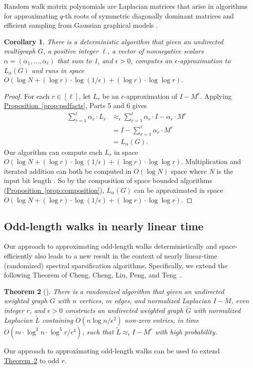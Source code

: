 \documentclass[11pt]{article}
\numberwithin{equation}{section}
\newtheorem{theorem}{Theorem}[section]
\newtheorem{corollary}[theorem]{Corollary}
\theoremstyle{definition}
\theoremstyle{plain}
\newcommand{\expref}[2]{\hyperref[#2]{#1~\ref{#2}}}
\newcommand{\wt}{\widetilde}   %
\newcommand{\SC}{O(\log N + (\log r)\cdot\log(1/\epsilon)+(\log r)\cdot \log\log r)}
\numberwithin{myalgctr}{section}
\theoremstyle{named}
\begin{document}
Random walk matrix polynomials are Laplacian matrices that arise in algorithms for approximating $q$-th roots of symmetric diagonally dominant matrices and efficient sampling from Gaussian graphical models \cite{loh12,cheng2015,ChengCLPT14}. 
\begin{corollary}
There is a deterministic algorithm that given an undirected multigraph $G$, a positive integer $\ell$, a vector of nonnegative scalars $\alpha=(\alpha_1,\ldots,\alpha_{\ell})$ that sum to 1, and $\epsilon>0$, computes an $\epsilon$-approximation to $L_{\alpha}(G)$ and runs in space $\SC$.
\end{corollary}
\begin{proof}
For each $r\in[\ell]$, let $L_r$ be an $\epsilon$-approximation of $I-M^r$. Applying \expref{Proposition}{prop:psdfacts}, Parts 5 and 6 gives
\begin{align*}
\sum_{r=1}^{\ell}\alpha_r\cdot L_{r} &\approx_{\epsilon}\sum_{r=1}^{\ell}\alpha_{r}\cdot I-\alpha_r\cdot M^r\\
&=I-\sum_{r=1}^{\ell}\alpha_{r}\cdot M^r\\
&=L_{\alpha}(G).
\end{align*}
Our algorithm can compute each $L_r$ in space $\SC$. Multiplication and iterated addition can both be computed in $O(\log N)$ space where $N$ is the input bit length \cite{BCH86,ABH02}. So by the composition of space bounded algorithms (\expref{Proposition}{prop:composition}), $L_{\alpha}(G)$ can be approximated in space $\SC$.
\end{proof}

%
\subsection{Odd-length walks in nearly linear time}
Our approach to approximating odd-length walks deterministically and space-efficiently also leads to a new result in the context of nearly linear-time (randomized) spectral sparsification algorithms. Specifically, we extend the following Theorem of Cheng, Cheng, Liu, Peng, and Teng~\cite{cheng2015}.

\begin{theorem}[\cite{cheng2015}]
\label{thm:lintime}
There is a randomized algorithm that given an undirected weighted graph  $G$ with $n$ vertices, $m$ edges, and normalized Laplacian $I-M$, \emph{even} integer $r$, and $\epsilon>0$ constructs an undirected weighted graph $\wt{G}$ with normalized Laplacian $\wt{L}$ containing $O(n\log n/\epsilon^2)$ non-zero entries, in time $O(m\cdot \log^3 n\cdot \log^5 r/\epsilon^4)$, such that $\wt{L}\approx_{\epsilon}I-M^r$ with high probability.
\end{theorem}
Our approach to approximating odd-length walks can be used to extend \expref{Theorem}{thm:lintime} to odd $r$. 
\end{document}
